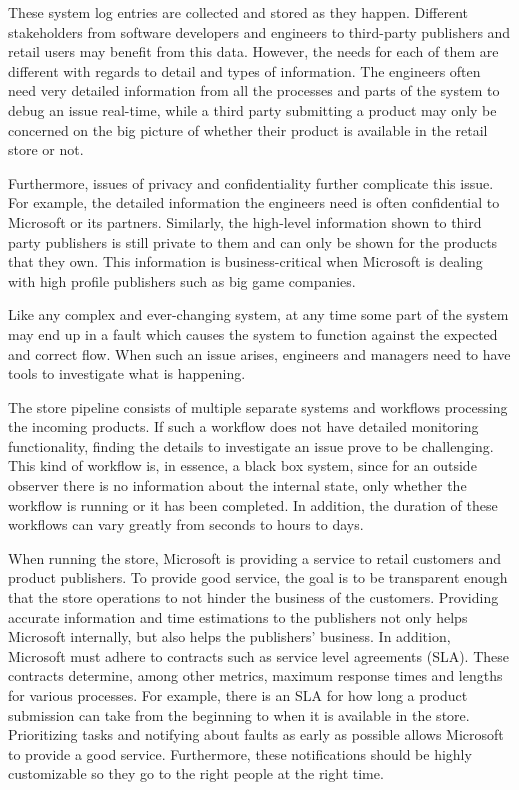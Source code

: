 \documentclass[english,12pt,a4paper,pdftex,sci,utf8]{aaltothesis}
\begin{document}
These system log entries are collected and stored as they happen. 
Different stakeholders from software developers and engineers to third-party publishers and retail users 
may benefit from this data. However, the needs for each of them are
different with regards to detail and types of information.
The engineers often need very detailed information from all the processes and parts of the system to debug an issue real-time,
while a third party submitting a product may only be concerned on the big picture of whether their 
product is available in the retail store or not.

Furthermore, issues of privacy and confidentiality further complicate this issue.
For example, the detailed information the engineers need is often confidential to Microsoft or its partners.
Similarly, the high-level information shown to third party publishers is still private to them 
and can only be shown for the products that they own.
This information is business-critical when Microsoft is dealing with high profile publishers such as big game companies.

Like any complex and ever-changing system, at any time some part of the system may end up in a fault
which causes the system to function against the expected and correct flow.
When such an issue arises, engineers and managers need to have tools to investigate what is happening. 

The store pipeline consists of multiple separate systems and workflows processing the incoming products.
If such a workflow does not have detailed monitoring functionality, 
finding the details to investigate an issue prove to be challenging.
This kind of workflow is, in essence, a black box system, since for an outside observer there is no information
about the internal state, only whether the workflow is running or it has been completed.
In addition, the duration of these workflows can vary greatly from seconds to hours to days. 

When running the store, Microsoft is providing a service to retail customers and product publishers.
To provide good service, the goal is to be transparent enough that the store operations to not hinder the
business of the customers. Providing accurate information and time estimations to the publishers
not only helps Microsoft internally, but also helps the publishers' business.
In addition, Microsoft must adhere to contracts such as
service level agreements (SLA). These contracts determine, among other metrics, 
maximum response times and lengths for various processes.
For example, there is an SLA for how long a product submission can take from the beginning to when it is available in the store.
Prioritizing tasks and notifying about faults as early as possible allows Microsoft to provide a good service. 
Furthermore, these notifications should be highly customizable so they go to the right people at the right time.
\end{document}
